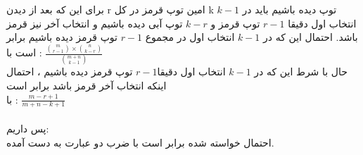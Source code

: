 برای این که بعد از دیدن r امین توپ قرمز در کل k توپ دیده باشیم باید در \(k - 1\) انتخاب اول دقیقا \(r - 1\) توپ قرمز و \(k - r \) توپ آبی دیده باشیم و انتخاب آخر نیز قرمز باشد. 
احتمال این که در \(k - 1\) انتخاب اول در مجموع \(r - 1\) توپ قرمز دیده باشیم برابر است با :  \(\frac{\binom{m}{r - 1}\times \binom{n}{k - r}}{\binom{m + n}{k - 1}}\)  
\\
حال با شرط این که در \(k - 1\) انتخاب اول دقیقا\( r - 1\) توپ قرمز دیده باشیم ، احتمال اینکه انتخاب آخر قرمز باشد برابر است\\ با :
 \(\frac{m - r + 1}{m + n - k + 1}\)
\\ \\
پس داریم:\\
احتمال خواسته شده برابر است با ضرب دو عبارت به دست آمده. 
